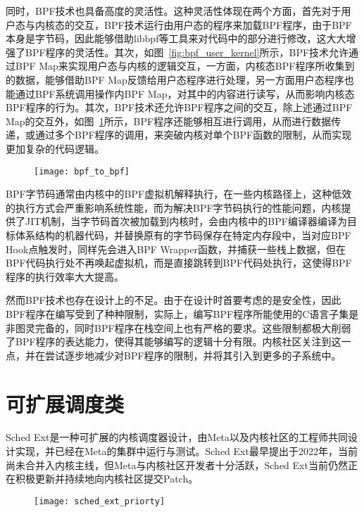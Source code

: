 同时，BPF技术也具备高度的灵活性。这种灵活性体现在两个方面，首先对于用户态与内核态的交互，BPF技术运行由用户态的程序来加载BPF程序，由于BPF本身是字节码，因此能够借助libbpf等工具来对代码中的部分进行修改，这大大增强了BPF程序的灵活性。其次，如图~\ref{fig:bpf_user_kernel}所示，BPF技术允许通过BPF Map来实现用户态与内核的逻辑交互，一方面，内核态BPF程序所收集到的数据，能够借助BPF Map反馈给用户态程序进行处理，另一方面用户态程序也能通过BPF系统调用操作内BPF Map，对其中的内容进行读写，从而影响内核态BPF程序的行为。其次，BPF技术还允许BPF程序之间的交互，除上述通过BPF Map的交互外，如图~\ref{fig:bpf_to_bpf}所示，BPF程序还能够相互进行调用，从而进行数据传递，或通过多个BPF程序的调用，来突破内核对单个BPF函数的限制，从而实现更加复杂的代码逻辑。

\begin{figure}[!htbp]
    \centering
    \texttt{[image: bpf\_to\_bpf]}
    \label{fig:bpf_to_bpf}
\end{figure}

BPF字节码通常由内核中的BPF虚拟机解释执行，在一些内核路径上，这种低效的执行方式会严重影响系统性能，而为解决BPF字节码执行的性能问题，内核提供了JIT机制，当字节码首次被加载到内核时，会由内核中的BPF编译器编译为目标体系结构的机器代码，并替换原有的字节码保存在特定内存段中，当对应BPF Hook点触发时，同样先会进入BPF Wrapper函数，并捕获一些栈上数据，但在BPF代码执行处不再唤起虚拟机，而是直接跳转到BPF代码处执行，这使得BPF程序的执行效率大大提高。

然而BPF技术也存在设计上的不足。由于在设计时首要考虑的是安全性，因此BPF程序在编写受到了种种限制，实际上，编写BPF程序所能使用的C语言子集是非图灵完备的，同时BPF程序在栈空间上也有严格的要求。这些限制都极大削弱了BPF程序的表达能力，使得其能够编写的逻辑十分有限。内核社区关注到这一点，并在尝试逐步地减少对BPF程序的限制，并将其引入到更多的子系统中。

\section{可扩展调度类}

Sched Ext是一种可扩展的内核调度器设计\citep{schedext}，由Meta以及内核社区的工程师共同设计实现，并已经在Meta的集群中运行与测试。Sched Ext最早提出于2022年，当前尚未合并入内核主线，但Meta与内核社区开发者十分活跃，Sched Ext当前仍然正在积极更新并持续地向内核社区提交Patch。

\begin{figure}[!htbp]
    \centering
    \texttt{[image: sched\_ext\_priorty]}
    \label{fig:sched_ext_priorty}
\end{figure}

